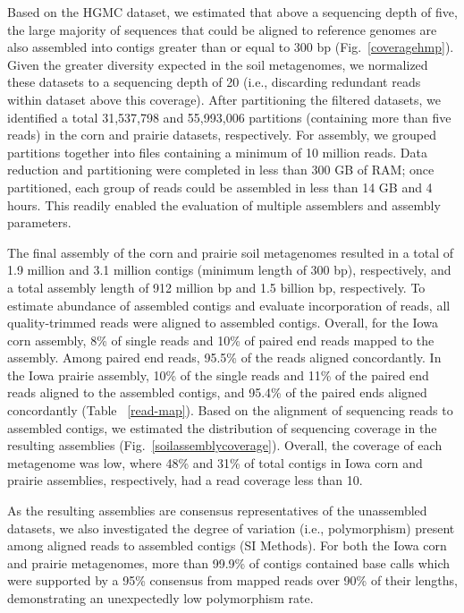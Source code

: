 \documentclass{pnastwo}
\begin{document}
\begin{article}
Based on the HGMC dataset, we estimated that above a sequencing depth of five,
the large majority of sequences that could be aligned to reference genomes are also assembled into contigs greater than or
equal to 300 bp (Fig.~\ref{coveragehmp}). Given the greater diversity expected in
the soil metagenomes, we normalized these datasets to a sequencing depth of 20
(i.e., discarding redundant reads within dataset above this coverage). After
partitioning the filtered datasets, we identified a total 31,537,798 and
55,993,006 partitions (containing more than five reads) in the corn and prairie
datasets, respectively. For assembly, we grouped partitions together into files
containing a minimum of 10 million reads. Data reduction and partitioning were
completed in less than 300 GB of RAM; once partitioned, each group of reads
could be assembled in less than 14 GB and 4 hours. This readily enabled the
evaluation of multiple assemblers and assembly parameters.

The final assembly of the corn and prairie soil metagenomes resulted in a total
of 1.9 million and 3.1 million contigs (minimum length of 300 bp), respectively,
and a total assembly length of 912 million bp and 1.5 billion bp, respectively.
To estimate abundance of assembled contigs and evaluate incorporation of reads,
all quality-trimmed reads were aligned to assembled contigs. Overall, for the
Iowa corn assembly, 8\% of single reads and 10\% of paired end reads mapped to
the assembly. Among paired end reads, 95.5\% of the reads aligned concordantly.
In the Iowa prairie assembly, 10\% of the single reads and 11\% of the paired
end reads aligned to the assembled contigs, and 95.4\% of the paired ends
aligned concordantly (Table ~\ref{read-map}). Based on the alignment of
sequencing reads to assembled contigs, we estimated the distribution of
sequencing coverage in the resulting assemblies (Fig.~\ref{soilassemblycoverage}).
Overall, the coverage of each metagenome was low, where 48\% and 31\% of total
contigs in Iowa corn and prairie assemblies, respectively, had a read
coverage less than 10.

As the resulting assemblies are consensus representatives of the unassembled
datasets, we also investigated the degree of variation (i.e., polymorphism)
present among aligned reads to assembled contigs (SI Methods). 
For both the Iowa corn and prairie metagenomes, more than 99.9\% of
contigs contained base calls which were supported by a 95\% consensus from
mapped reads over 90\% of their lengths, demonstrating an unexpectedly low
polymorphism rate.
 

\end{article}
\end{document}
